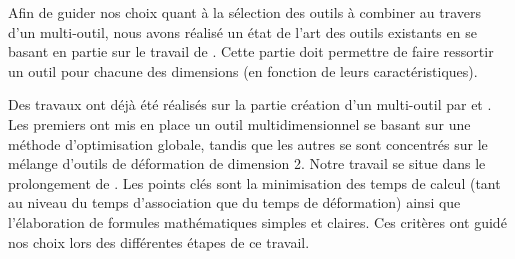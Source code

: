 Afin de guider nos choix quant à la sélection des outils à combiner au travers
d'un multi-outil, nous avons réalisé un état de l'art des outils existants en
se basant en partie sur le travail de \cite{GB08}. Cette partie doit permettre
de faire ressortir un outil pour chacune des dimensions (en fonction de leurs
caractéristiques).

Des travaux ont déjà été réalisés sur la partie création d'un multi-outil par
\cite{JBPS11} et \cite{GPCP13}. Les premiers ont mis en place un outil
multidimensionnel se basant sur une méthode d'optimisation globale, tandis que
les autres se sont concentrés sur le mélange d'outils de déformation de
dimension 2. Notre travail se situe dans le prolongement de \cite{GPCP13}. Les
points clés sont la minimisation des temps de calcul (tant au niveau du temps
d'association que du temps de déformation) ainsi que l'élaboration de formules
mathématiques simples et claires. Ces critères ont guidé nos choix lors des
différentes étapes de ce travail.
